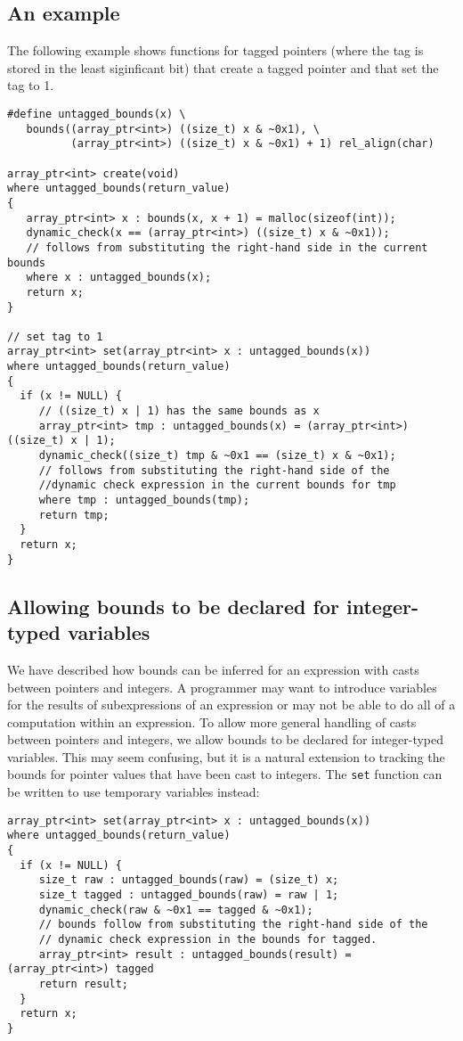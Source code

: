 \subsection{An example}

The following example shows functions for tagged pointers
(where the tag is stored in the least siginficant bit) that
create a tagged pointer and that set the tag to 1.

\begin{lstlisting}
#define untagged_bounds(x) \
   bounds((array_ptr<int>) ((size_t) x & ~0x1), \
          (array_ptr<int>) ((size_t) x & ~0x1) + 1) rel_align(char)

array_ptr<int> create(void) 
where untagged_bounds(return_value)
{
   array_ptr<int> x : bounds(x, x + 1) = malloc(sizeof(int));
   dynamic_check(x == (array_ptr<int>) ((size_t) x & ~0x1));
   // follows from substituting the right-hand side in the current bounds
   where x : untagged_bounds(x); 
   return x;
}

// set tag to 1
array_ptr<int> set(array_ptr<int> x : untagged_bounds(x)) 
where untagged_bounds(return_value)
{
  if (x != NULL) {
     // ((size_t) x | 1) has the same bounds as x                   
     array_ptr<int> tmp : untagged_bounds(x) = (array_ptr<int>) ((size_t) x | 1);
     dynamic_check((size_t) tmp & ~0x1 == (size_t) x & ~0x1);
     // follows from substituting the right-hand side of the
     //dynamic check expression in the current bounds for tmp
     where tmp : untagged_bounds(tmp);
     return tmp;
  }
  return x;
}
\end{lstlisting}

\subsection{Allowing bounds to be declared for integer-typed variables}

We have described how bounds can be inferred for an expression with
casts between pointers and integers.  A programmer may want to
introduce variables for the results of subexpressions of an
expression or may not be able to do all of a computation within an expression.
To allow more general handling of casts between pointers and
integers, we allow bounds to be declared for integer-typed variables.
This may seem confusing, but it is a natural extension to tracking the
bounds for pointer values that have been cast to integers.   The \lstinline+set+
function can be written to use temporary variables instead:
\begin{lstlisting}
array_ptr<int> set(array_ptr<int> x : untagged_bounds(x))
where untagged_bounds(return_value)
{
  if (x != NULL) {
     size_t raw : untagged_bounds(raw) = (size_t) x;
     size_t tagged : untagged_bounds(raw) = raw | 1;
     dynamic_check(raw & ~0x1 == tagged & ~0x1);
     // bounds follow from substituting the right-hand side of the
     // dynamic check expression in the bounds for tagged.
     array_ptr<int> result : untagged_bounds(result) = (array_ptr<int>) tagged
     return result;
  }
  return x;
}
\end{lstlisting}

